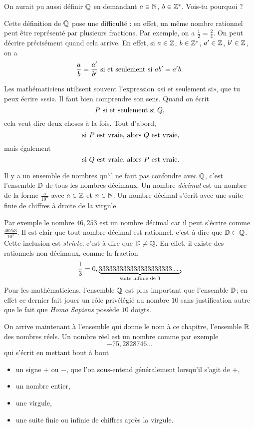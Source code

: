 \begin{remarque}
	On aurait pu aussi définir $\mathbb{Q}$ en demandant $a \in \mathbb{N}$, $b \in \mathbb{Z}^*$. Vois-tu pourquoi ?
\end{remarque}

Cette définition de $\mathbb{Q}$ pose une difficulté : en effet, un même nombre rationnel peut être représenté par plusieurs fractions. Par exemple, on a $\frac 12 = \frac 24$. On peut décrire précisément quand cela arrive. En effet, si $a \in \mathbb{Z}$, $b \in \mathbb{Z}^*$, $a' \in \mathbb{Z}$, $b' \in \mathbb{Z}$, on a
\[ \frac{a}{b} = \frac{a'}{b'} \textnormal{ si et seulement si } ab'=a'b .\]

Les mathématiciens utilisent souvent l'expression «si et seulement si», que tu peux écrire «ssi». Il faut bien comprendre son sens. Quand on écrit
\[ P \textnormal{ si et seulement si }Q ,\]
cela veut dire deux choses à la fois. Tout d'abord,
\[ \textnormal{ si }P\textnormal{ est vraie, alors }Q\textnormal{ est vraie},\]
mais également
\[ \textnormal{ si }Q\textnormal{ est vraie, alors }P\textnormal{ est vraie}.\]

Il y a un ensemble de nombres qu'il ne faut pas confondre avec $\mathbb{Q}$, c'est l'ensemble $\mathbb{D}$ de tous les nombres décimaux. Un nombre \emph{décimal} est un nombre de la forme $\frac{a}{10^n}$ avec $a \in \mathbb{Z}$ et $n \in \mathbb{N}$. Un nombre décimal s'écrit avec une suite finie de chiffres à droite de la virgule.

Par exemple le nombre $46,253$ est un nombre décimal car il peut s'écrire comme $\frac{46253}{10^3}$. Il est clair que tout nombre décimal est rationnel, c'est à dire que $\mathbb{D} \subset \mathbb{Q}$. Cette inclusion est \emph{stricte}, c'est-à-dire que $\mathbb{D} \not= \mathbb{Q}$. En effet, il existe des rationnels non décimaux, comme la fraction
\[ \frac{1}{3} = 0,\underbrace{333333333333333333333\dots}_{\textnormal{suite infinie de }3} \]
Pour les mathématiciens, l'ensemble $\mathbb{Q}$ est plus important que l'ensemble $\mathbb{D}$; en effet ce dernier fait jouer un rôle privélégié au nombre $10$ sans justification autre que le fait que \emph{Homo Sapiens} possède $10$ doigts.

On arrive maintenant à l'ensemble qui donne le nom à ce chapitre, l'ensemble $\mathbb{R}$ des nombres réels. Un nombre réel est un nombre comme par exemple
\[ -75,2828746\dots \]
qui s'écrit en mettant bout à bout
\begin{itemize}
	\item un signe $+$ ou $-$, que l'on sous-entend généralement lorsqu'il s'agit de $+$,
	\item un nombre entier,
	\item une virgule,
	\item une suite finie ou infinie de chiffres après la virgule.
\end{itemize}

